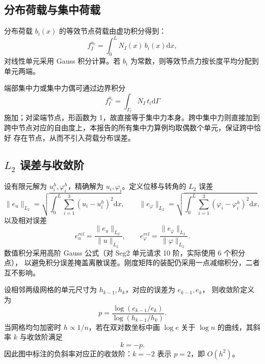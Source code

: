 \documentclass[UTF8,a4paper,11pt]{ctexart}
\newcommand{\ud}{\mathrm{d}}
\begin{document}
\subsection{分布荷载与集中荷载}

分布荷载 $b_i(x)$ 的等效节点荷载由虚功积分得到：
\begin{equation}\label{eq:bodyload}
f_I^{u_i}=\int_0^L N_I(x)\,b_i(x)\ud x,
\end{equation}
对线性单元采用 Gauss 积分计算。若 $b_i$ 为常数，则等效节点力按长度平均分配到
单元两端。

端部集中力或集中力偶可通过边界积分
\begin{equation}\label{eq:traction}
f_I^{u_i}=\int_{\Gamma_t}N_I\,t_i\ud\Gamma
\end{equation}
施加；对梁端节点，形函数为 1，故直接等于集中力本身。跨中集中力则直接加到
跨中节点对应的自由度上，本报告的所有集中力算例均取偶数个单元，保证跨中恰好
存在节点，从而不引入荷载分布误差。

\subsection{$L_2$ 误差与收敛阶}

设有限元解为 $u_i^h,\varphi_i^h$，精确解为 $u_i,\varphi_i$。定义位移与转角的
$L_2$ 误差
\begin{equation}\label{eq:L2}
\|e_u\|_{L_2}=\sqrt{\int_0^L\sum_{i=1}^3\left(u_i-u_i^h\right)^2\ud x},
\qquad
\|e_\varphi\|_{L_2}=\sqrt{\int_0^L\sum_{i=1}^3\left(\varphi_i-\varphi_i^h\right)^2\ud x},
\end{equation}
以及相对误差
\begin{equation}\label{eq:L2rel}
e_u^{rel}=\frac{\|e_u\|_{L_2}}{\|u\|_{L_2}},\qquad
e_\varphi^{rel}=\frac{\|e_\varphi\|_{L_2}}{\|\varphi\|_{L_2}}.
\end{equation}
数值积分采用高阶 Gauss 公式（对 Seg2 单元请求 10 阶，实际使用 6 个积分点），
以避免积分误差掩盖离散误差。刚度矩阵的装配仍采用一点减缩积分，二者互不影响。

设相邻两级网格的单元尺寸为 $h_{k-1},h_k$，对应的误差为 $e_{k-1},e_k$，
则收敛阶定义为
\begin{equation}\label{eq:rate}
p=\frac{\log\left(e_{k-1}/e_k\right)}{\log\left(h_{k-1}/h_k\right)}.
\end{equation}
当网格均匀加密时 $h\propto1/n$，若在双对数坐标中画 $\log e$ 关于 $\log n$
的曲线，其斜率 $k$ 与收敛阶满足
\begin{equation}\label{eq:slope}
k=-p.
\end{equation}
因此图中标注的负斜率对应正的收敛阶：$k=-2$ 表示 $p=2$，即 $O(h^2)$。
\end{document}
